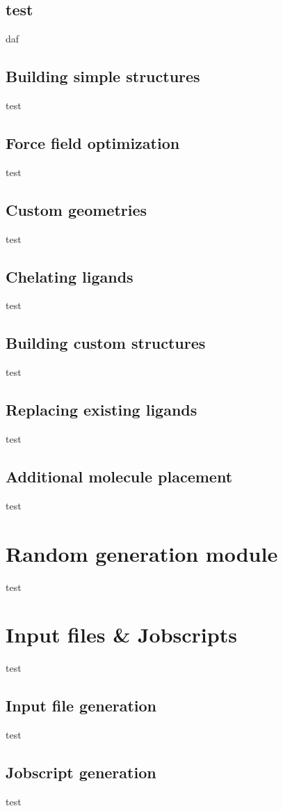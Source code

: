 \documentclass[a4paper,12pt]{assignment}
\begin{document}
\subsection{test}
daf



\subsection{Building simple structures}
test

\subsection{Force field optimization}
test%

\subsection{Custom geometries}
test
\subsection{Chelating ligands}
test
\subsection{Building custom structures}
test
\subsection{Replacing existing ligands}
test

\subsection{Additional molecule placement}
test
\section{Random generation module}
test

\section{Input files \& Jobscripts}
test
\subsection{Input file generation}
test
\subsection{Jobscript generation}
test
\end{document}
